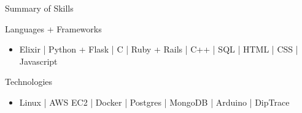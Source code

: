 \documentclass[calibri]{mcdowellcv}
\begin{document}
    \makeheader

    \begin{cvsection}{\Large{Summary of Skills}}
        \begin{cvsubsection}{Languages + Frameworks}{}{}
            \begin{itemize}
                \item Elixir | Python + Flask | C | Ruby + Rails | C++ | SQL | HTML | CSS | Javascript
            \end{itemize}
        \end{cvsubsection}
        \begin{cvsubsection}{Technologies}{}{}
            \begin{itemize}
                \item Linux | AWS EC2 | Docker | Postgres | MongoDB | Arduino | DipTrace
            \end{itemize}
        \end{cvsubsection}
    \end{cvsection}
\end{document}
